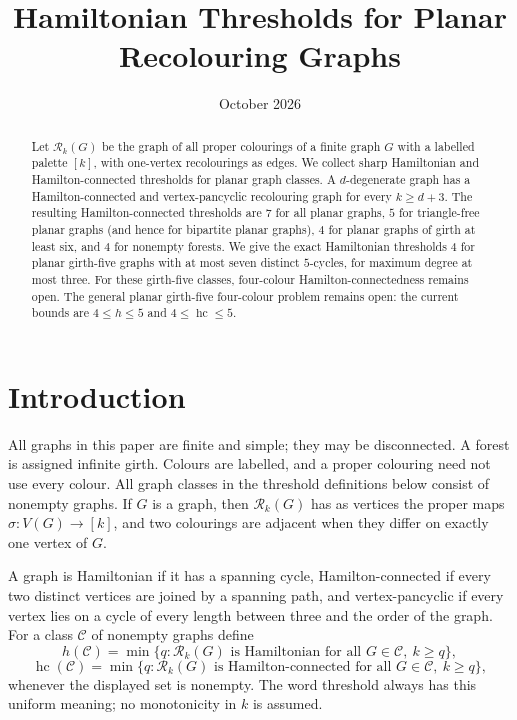 \documentclass[11pt]{article}
\title{Hamiltonian Thresholds for Planar Recolouring Graphs}
\author{}
\date{October 2026}
\theoremstyle{remark}
\newcommand{\Rk}{\mathcal R_k}
\newcommand{\hc}{\operatorname{hc}}
\numberwithin{equation}{section}
\numberwithin{table}{section}
\begin{document}
\maketitle

\begin{abstract}
Let $\Rk(G)$ be the graph of all proper colourings of a finite graph $G$ with a labelled palette $[k]$, with one-vertex recolourings as edges.  We collect sharp Hamiltonian and Hamilton-connected thresholds for planar graph classes.  A $d$-degenerate graph has a Hamilton-connected and vertex-pancyclic recolouring graph for every $k\ge d+3$.  The resulting Hamilton-connected thresholds are $7$ for all planar graphs, $5$ for triangle-free planar graphs (and hence for bipartite planar graphs), $4$ for planar graphs of girth at least six, and $4$ for nonempty forests.  We give the exact Hamiltonian thresholds $4$ for planar girth-five graphs with at most seven distinct $5$-cycles, for maximum degree at most three.  For these girth-five classes, four-colour Hamilton-connectedness remains open.  The general planar girth-five four-colour problem remains open: the current bounds are $4\le h\le5$ and $4\le\hc\le5$.
\end{abstract}

\section{Introduction}

All graphs in this paper are finite and simple; they may be disconnected.  A forest is assigned infinite girth.  Colours are labelled, and a proper colouring need not use every colour. All graph classes in the threshold definitions below consist of nonempty graphs.  If $G$ is a graph, then $\Rk(G)$ has as vertices the proper maps $\sigma:V(G)\to[k]$, and two colourings are adjacent when they differ on exactly one vertex of $G$.

A graph is Hamiltonian if it has a spanning cycle, Hamilton-connected if every two distinct vertices are joined by a spanning path, and vertex-pancyclic if every vertex lies on a cycle of every length between three and the order of the graph.  For a class $\mathcal C$ of nonempty graphs define
\[
 h(\mathcal C)=\min\{q: \Rk(G)\text{ is Hamiltonian for all }G\in\mathcal C,\ k\ge q\},
\]
\[
 \hc(\mathcal C)=\min\{q: \Rk(G)\text{ is Hamilton-connected for all }G\in\mathcal C,\ k\ge q\},
\]
whenever the displayed set is nonempty.  The word threshold always has this uniform meaning; no monotonicity in $k$ is assumed.
\end{document}
